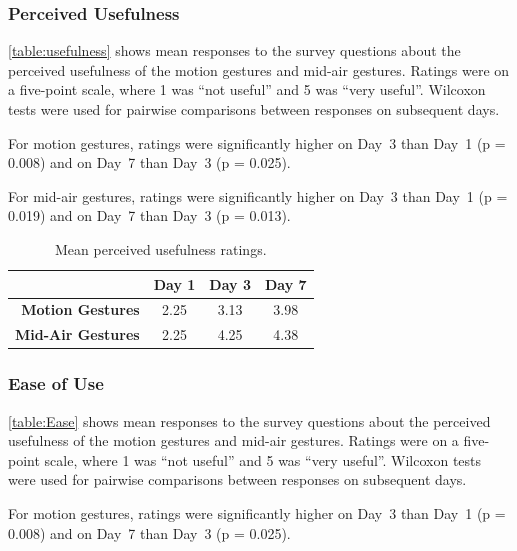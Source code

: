 \documentclass{l4proj}
\begin{document}

\subsubsection{Perceived Usefulness}

\autoref{table:usefulness} shows mean responses to the survey questions about the perceived usefulness of the motion gestures and mid-air gestures. Ratings were on a five-point scale, where 1 was ``not useful'' and 5 was ``very useful''. Wilcoxon tests were used for pairwise comparisons between responses on subsequent days.

For motion gestures, ratings were significantly higher on Day~3 than Day~1 (p = 0.008) and on Day~7 than Day~3 (p = 0.025).

For mid-air gestures, ratings were significantly higher on Day~3 than Day~1 (p = 0.019) and on Day~7 than Day~3 (p = 0.013).

\begin{table}
\centering
\begin{tabular}{r c c c}
                              & \textbf{Day 1} & \textbf{Day 3} & \textbf{Day 7} \\ \toprule
    \textbf{Motion Gestures}  & 2.25           & 3.13           & 3.98  \\
    \textbf{Mid-Air Gestures} & 2.25           & 4.25           & 4.38 \\ \bottomrule
\end{tabular}
\caption{Mean perceived usefulness ratings.}
\label{table:usefulness}
\end{table}

\subsubsection{Ease of Use}

\autoref{table:Ease} shows mean responses to the survey questions about the perceived usefulness of the motion gestures and mid-air gestures. Ratings were on a five-point scale, where 1 was ``not useful'' and 5 was ``very useful''. Wilcoxon tests were used for pairwise comparisons between responses on subsequent days.

For motion gestures, ratings were significantly higher on Day~3 than Day~1 (p = 0.008) and on Day~7 than Day~3 (p = 0.025).
\end{document}
